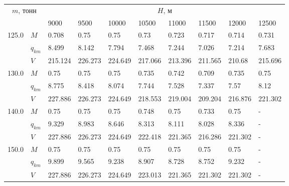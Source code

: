 \begin{tabular}{|l|l|llllllll|}\hline
\multicolumn{2}{|c|}{$m$, тонн}& \multicolumn{8}{c|}{$H$, м}\\ 
 \cline{3-10}
 \multicolumn{2}{|c|}{}&     9000 &     9500 &    10000 &                     10500 &                     11000 &                     11500 &    12000 &    12500 \\
\hline
125.0 & $M$ &    0.708 &     0.75 &     0.75 &                      0.73 &                     0.723 &    0.717\cellcolor{green} &    0.714 &    0.731 \\
      & $q_{km}$ &    8.499 &    8.142 &    7.794 &                     7.468 &                     7.244 &    7.026\cellcolor{green} &    7.214 &    7.683 \\
      & $V$ &  215.124 &  226.273 &  224.649 &                   217.066 &                   213.396 &  211.565\cellcolor{green} &   210.68 &  215.696 \\
\hline
130.0 & $M$ &     0.75 &     0.75 &     0.75 &                     0.735 &                     0.742 &    0.709\cellcolor{green} &    0.735 &     0.75 \\
      & $q_{km}$ &    8.775 &    8.418 &    8.074 &                     7.744 &                     7.528 &    7.337\cellcolor{green} &     7.57 &     8.12 \\
      & $V$ &  227.886 &  226.273 &  224.649 &                   218.553 &                   219.004 &  209.204\cellcolor{green} &  216.876 &  221.302 \\
\hline
140.0 & $M$ &     0.75 &     0.75 &     0.75 &                     0.748 &                      0.75 &    0.733\cellcolor{green} &     0.75 &        - \\
      & $q_{km}$ &    9.329 &    8.983 &    8.646 &                     8.313 &                     8.111 &    8.028\cellcolor{green} &    8.336 &        - \\
      & $V$ &  227.886 &  226.273 &  224.649 &                   222.418 &                   221.365 &  216.286\cellcolor{green} &  221.302 &        - \\
\hline
150.0 & $M$ &     0.75 &     0.75 &     0.75 &                      0.75 &     0.75\cellcolor{green} &                      0.75 &     0.75 &        - \\
      & $q_{km}$ &    9.899 &    9.565 &    9.238 &                     8.907 &    8.728\cellcolor{green} &                     8.752 &    9.232 &        - \\
      & $V$ &  227.886 &  226.273 &  224.649 &                   223.013 &  221.365\cellcolor{green} &                   221.302 &  221.302 &        - \\

\end{tabular}
